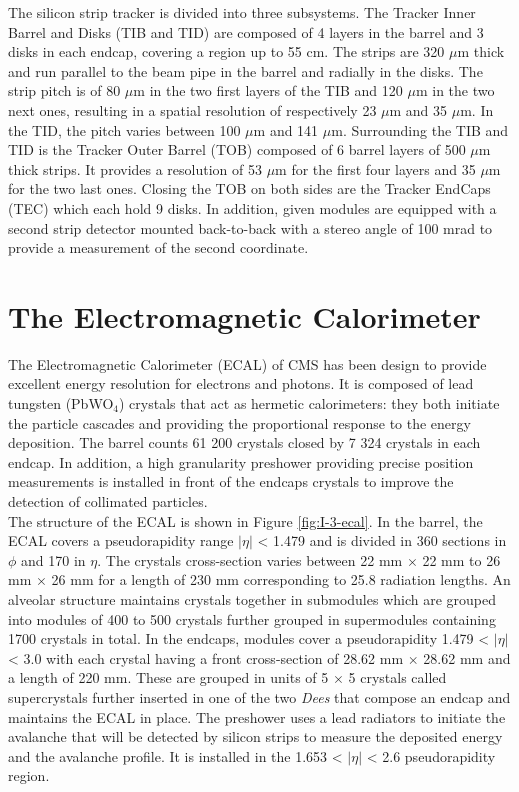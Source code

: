     The silicon strip tracker is divided into three subsystems. The Tracker Inner Barrel and Disks (TIB and TID) are composed of 4 layers in the barrel and 3 disks in each endcap, covering a region up to 55 cm. The strips are 320 $\mu$m thick and run parallel to the beam pipe in the barrel and radially in the disks. The strip pitch is of 80 $\mu$m in the two first layers of the TIB and 120 $\mu$m in the two next ones, resulting in a spatial resolution of respectively 23 $\mu$m and 35 $\mu$m. In the TID, the pitch varies between 100 $\mu$m and 141 $\mu$m. Surrounding the TIB and TID is the Tracker Outer Barrel (TOB) composed of 6 barrel layers of 500 $\mu$m thick strips. It provides a resolution of 53 $\mu$m for the first four layers and 35 $\mu$m for the two last ones. Closing the TOB on both sides are the Tracker EndCaps (TEC) which each hold 9 disks. In addition, given modules are equipped with a second strip detector mounted back-to-back with a stereo angle of 100 mrad to provide a measurement of the second coordinate.

  \section{The Electromagnetic Calorimeter}

    The Electromagnetic Calorimeter (ECAL) of CMS has been design to provide excellent energy resolution for electrons and photons. It is composed of lead tungsten (PbWO$_4$) crystals that act as hermetic calorimeters: they both initiate the particle cascades and providing the proportional response to the energy deposition. The barrel counts 61 200 crystals closed by 7 324 crystals in each endcap. In addition, a high granularity preshower providing precise position measurements is installed in front of the endcaps crystals to improve the detection of collimated particles. \\

    The structure of the ECAL is shown in Figure \ref{fig:I-3-ecal}. In the barrel, the ECAL covers a pseudorapidity range $ | \eta | $ < 1.479 and is divided in 360 sections in $ \phi $ and 170 in $ \eta $. The crystals cross-section varies between 22 mm $ \times $ 22 mm to 26 mm $ \times $ 26 mm for a length of 230 mm corresponding to 25.8 radiation lengths. An alveolar structure maintains crystals together in submodules which are grouped into modules of 400 to 500 crystals further grouped in supermodules containing 1700 crystals in total. In the endcaps, modules cover a pseudorapidity 1.479 < $ | \eta | $ < 3.0 with each crystal having a front cross-section of 28.62 mm $ \times $ 28.62 mm and a length of 220 mm. These are grouped in units of 5 $ \times $ 5 crystals called supercrystals further inserted in one of the two \emph{Dees} that compose an endcap and maintains the ECAL in place. The preshower uses a lead radiators to initiate the avalanche that will be detected by silicon strips to measure the deposited energy and the avalanche profile. It is installed in the 1.653 < $ | \eta | $ < 2.6 pseudorapidity region. \\


